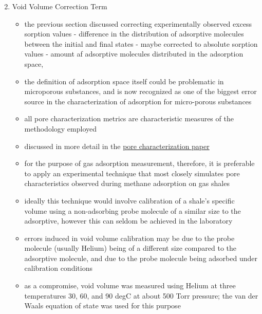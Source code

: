 \documentclass[11pt]{article}
\begin{document}
\begin{enumerate}
\begin{equation}
\end{equation}
\item Void Volume Correction Term
\label{sec:orgf37f447}
\begin{itemize}
\item the previous section discussed correcting experimentally observed excess sorption values - difference in the distribution of adsorptive molecules between the initial and final states - maybe corrected to absolute sorption values - amount af adsorptive molecules distributed in the adsorption space,
\item the definition of adsorption space itself could be problematic in microporous substances, and is now recognized as one of the biggest error source in the characterization of adsorption for micro-porous substances \cite{Rouquerol2016}
\item all pore characterization metrics are characteristic measures of the methodology employed
\item discussed in more detail in the \href{bowlandpore.org}{pore characterization paper}
\item for the purpose of gas adsorption measurement, therefore, it is preferable to apply an experimental technique that most closely simulates pore characteristics observed during methane adsorption on gas shales
\item ideally this technique would involve calibration of a shale's specific volume using a non-adsorbing probe molecule of a similar size to the adsorptive, however this can seldom be achieved in the laboratory
\item errors induced in void volume calibration may be due to the probe molecule (usually Helium) being of a different size compared to the adsorptive molecule, and due to the probe molecule being adsorbed under calibration conditions
\item as a compromise, void volume was measured using Helium at three temperatures 30, 60, and 90 degC at about 500 Torr pressure; the van der Waals equation of state was used for this purpose
\end{itemize}
\end{enumerate}
\end{document}
